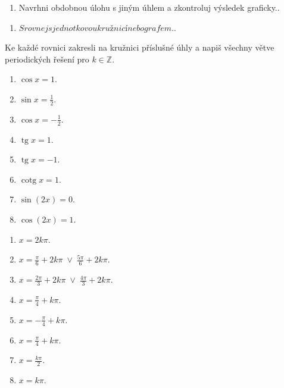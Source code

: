 \documentclass[11pt,a4paper]{article}
\begin{document}
\begin{zadaniReseniBox}[title={Rozšíření 1}]
\begin{enumerate}[label=\alph*)]
\item Navrhni obdobnou úlohu s jiným úhlem a zkontroluj výsledek graficky..
\end{enumerate}
\tcblower
\begin{enumerate}[label=\alph*)]
\item $Srovnej s jednotkovou kružnicí nebo grafem.$.
\end{enumerate}
\end{zadaniReseniBox}
Ke každé rovnici zakresli na kružnici příslušné úhly a napiš všechny větve periodických řešení pro $k\in\mathbb Z$.
\begin{zadaniReseniBox}[title={Domácí úkol}]
\begin{enumerate}[label=\alph*)]
\item $\cos x=1$.
\item $\sin x=\frac{1}{2}$.
\item $\cos x=-\frac{1}{2}$.
\item $\operatorname{tg}x=1$.
\item $\operatorname{tg}x=-1$.
\item $\operatorname{cotg}x=1$.
\item $\sin(2x)=0$.
\item $\cos(2x)=1$.
\end{enumerate}
\tcblower
\begin{enumerate}[label=\alph*)]
\item $x=2k\pi$.
\item $x=\frac{\pi}{6}+2k\pi\;\lor\;\frac{5\pi}{6}+2k\pi$.
\item $x=\frac{2\pi}{3}+2k\pi\;\lor\;\frac{4\pi}{3}+2k\pi$.
\item $x=\frac{\pi}{4}+k\pi$.
\item $x=-\frac{\pi}{4}+k\pi$.
\item $x=\frac{\pi}{4}+k\pi$.
\item $x=\frac{k\pi}{2}$.
\item $x=k\pi$.
\end{enumerate}
\end{zadaniReseniBox}
\end{document}
